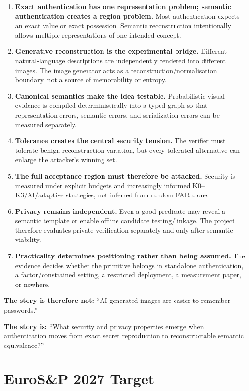 \documentclass[11pt,a4paper]{article}
\begin{document}
\begin{enumerate}
  \item \textbf{Exact authentication has one representation problem; semantic authentication creates a region problem.} Most authentication expects an exact value or exact possession. Semantic reconstruction intentionally allows multiple representations of one intended concept.
  \item \textbf{Generative reconstruction is the experimental bridge.} Different natural-language descriptions are independently rendered into different images. The image generator acts as a reconstruction/normalisation boundary, not a source of memorability or entropy.
  \item \textbf{Canonical semantics make the idea testable.} Probabilistic visual evidence is compiled deterministically into a typed graph so that representation errors, semantic errors, and serialization errors can be measured separately.
  \item \textbf{Tolerance creates the central security tension.} The verifier must tolerate benign reconstruction variation, but every tolerated alternative can enlarge the attacker's winning set.
  \item \textbf{The full acceptance region must therefore be attacked.} Security is measured under explicit budgets and increasingly informed K0--K3/AI/adaptive strategies, not inferred from random FAR alone.
  \item \textbf{Privacy remains independent.} Even a good predicate may reveal a semantic template or enable offline candidate testing/linkage. The project therefore evaluates private verification separately and only after semantic viability.
  \item \textbf{Practicality determines positioning rather than being assumed.} The evidence decides whether the primitive belongs in standalone authentication, a factor/constrained setting, a restricted deployment, a measurement paper, or nowhere.
\end{enumerate}

\begin{keybox}
\textbf{The story is therefore not:} ``AI-generated images are easier-to-remember passwords.''\par\medskip
\textbf{The story is:} ``What security and privacy properties emerge when authentication moves from exact secret reproduction to reconstructable semantic equivalence?''
\end{keybox}

\section{EuroS\&P 2027 Target}
\end{document}

